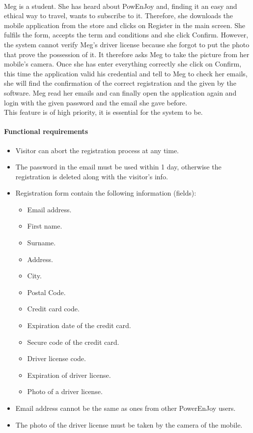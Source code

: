  \ \\
Meg is a student. She has heard about PowEnJoy and, finding it an easy and ethical way to travel, wants to subscribe to it.
Therefore, she downloads the mobile application from the store and clicks on Register in the main screen. She fulfils the form, accepts the term and conditions  and she click Confirm. However, the system cannot verify Meg's driver license because she forgot to put the photo that prove the possession of it. It therefore asks Meg to take the picture from her mobile's camera. Once she has enter everything correctly she click on Confirm, this time the application valid his credential and tell to Meg to check her emails, she will find the confirmation of the correct registration and the given by the software. Meg read her emails and can finally open the application again and login with the given password and the email she gave before.
 \ \\
This feature is of high priority, it is essential for the system to be.
\paragraph{Functional requirements}
\begin{itemize}
	\item Visitor can abort the registration process at any time.
	\item The password in the email must be used within 1 day, otherwise the registration is deleted along with the visitor's info.
	\item Registration form contain the following information (fields):
	\begin{itemize}
		\item Email address.
		\item First name.
		\item Surname.
		\item Address.
		\item City.
		\item Postal Code.
		\item Credit card code.
		\item Expiration date of the credit card.
		\item Secure code of the credit card.
		\item Driver license code.
		\item Expiration of driver license.
		\item Photo of a driver license.
	\end{itemize}
	\item Email address cannot be the same as ones from other PowerEnJoy users.
	\item The photo of the driver license must be taken by the camera of the mobile.
\end{itemize}
\newpage

